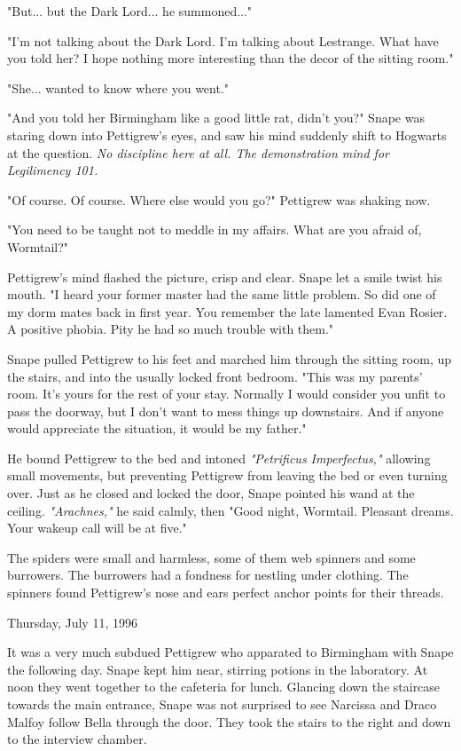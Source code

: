 \documentclass[a4paper,11pt]{article}
\begin{document}
"But... but the Dark Lord... he summoned..."

"I'm not talking about the Dark Lord. I'm talking about Lestrange. What have you told her? I hope nothing more interesting than the decor of the sitting room."

"She... wanted to know where you went."

"And you told her Birmingham like a good little rat, didn't you?" Snape was staring down into Pettigrew's eyes, and saw his mind suddenly shift to Hogwarts at the question. \emph{No discipline here at all. The demonstration mind for Legilimency 101.}

"Of course. Of course. Where else would you go?" Pettigrew was shaking now.

"You need to be taught not to meddle in my affairs. What are you afraid of, Wormtail?"

Pettigrew's mind flashed the picture, crisp and clear. Snape let a smile twist his mouth. "I heard your former master had the same little problem. So did one of my dorm mates back in first year. You remember the late lamented Evan Rosier. A positive phobia. Pity he had so much trouble with them."

Snape pulled Pettigrew to his feet and marched him through the sitting room, up the stairs, and into the usually locked front bedroom. "This was my parents' room. It's yours for the rest of your stay. Normally I would consider you unfit to pass the doorway, but I don't want to mess things up downstairs. And if anyone would appreciate the situation, it would be my father."

He bound Pettigrew to the bed and intoned \emph{"Petrificus Imperfectus,"} allowing small movements, but preventing Pettigrew from leaving the bed or even turning over. Just as he closed and locked the door, Snape pointed his wand at the ceiling. \emph{"Arachnes,"} he said calmly, then "Good night, Wormtail. Pleasant dreams. Your wakeup call will be at five."

The spiders were small and harmless, some of them web spinners and some burrowers. The burrowers had a fondness for nestling under clothing. The spinners found Pettigrew's nose and ears perfect anchor points for their threads.

Thursday, July 11, 1996

It was a very much subdued Pettigrew who apparated to Birmingham with Snape the following day. Snape kept him near, stirring potions in the laboratory. At noon they went together to the cafeteria for lunch. Glancing down the staircase towards the main entrance, Snape was not surprised to see Narcissa and Draco Malfoy follow Bella through the door. They took the stairs to the right and down to the interview chamber.
\end{document}
